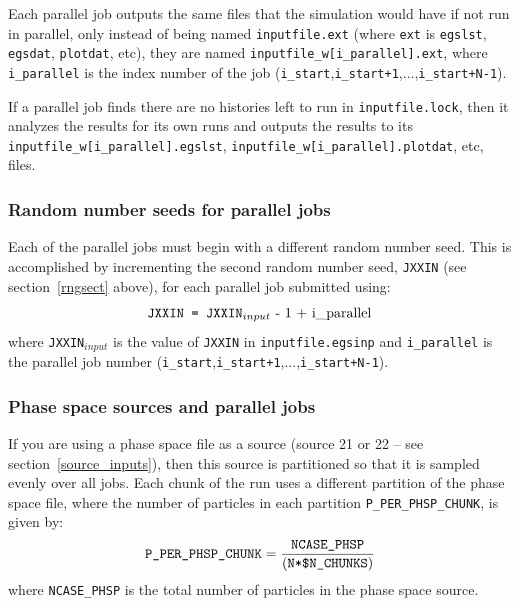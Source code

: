 \documentclass[12pt,twoside]{article}  %
\begin{document}
Each parallel job outputs the same files that the simulation would
have if not run in parallel, only instead of being named
{\tt inputfile.ext} (where {\tt ext} is {\tt egslst}, {\tt egsdat},
{\tt plotdat}, etc), they are named {\tt inputfile\_w[i\_parallel].ext},
where {\tt i\_parallel} is the index number of the job
({\tt i\_start},{\tt i\_start+1},...,{\tt i\_start+N-1}).

If a parallel job finds there are no histories left to run in
{\tt inputfile.lock}, then it analyzes the results for its own runs
and outputs the results to its {\tt inputfile\_w[i\_parallel].egslst},
{\tt inputfile\_w[i\_parallel].plotdat}, etc, files.

\subsubsection{Random number seeds for parallel jobs}
Each of the parallel jobs must begin with a different random
number seed.  This is accomplished by incrementing the second
random number seed, {\tt JXXIN} (see section~\ref{rngsect} above),
for each parallel job submitted using:
\begin{equation}
\mbox{\tt JXXIN = JXXIN}_{input} \mbox{ - 1 + i\_parallel}
\end{equation}
where {\tt JXXIN$_{input}$} is the value of {\tt JXXIN} in {\tt inputfile.egsinp}
and {\tt i\_parallel} is the parallel job number
({\tt i\_start},{\tt i\_start+1},...,{\tt i\_start+N-1}).

\subsubsection{Phase space sources and parallel jobs}
If you are using a phase space file
as a source (source 21 or 22 -- see section~\ref{source_inputs}),
then this source is partitioned so that it is sampled
evenly over all jobs.  Each chunk of the run uses a different partition
of the phase space file, where the number of particles in each
partition
{\tt P\_PER\_PHSP\_CHUNK}, is given by:
\begin{equation}
\mbox{\tt P\_PER\_PHSP\_CHUNK} = \frac{\mbox{\tt NCASE\_PHSP}}{\left(\mbox{\tt
N*\$N\_CHUNKS}\right)}
\end{equation}
where {\tt NCASE\_PHSP} is the total number of particles in the phase
space source.
\end{document}

